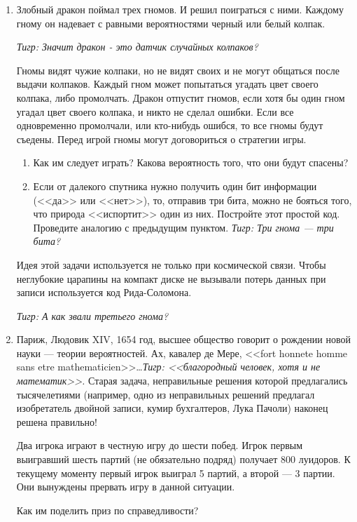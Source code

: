 \documentclass[12pt,a4paper]{article}
\begin{document}
\begin{enumerate}
\item Злобный дракон поймал трех гномов. И решил поиграться с ними. Каждому гному он надевает с равными вероятностями черный или белый колпак. \par
{\it Тигр: Значит дракон - это датчик случайных колпаков?} \par
Гномы видят чужие колпаки, но не видят своих и не могут общаться после выдачи колпаков. Каждый гном может попытаться угадать цвет своего колпака, либо промолчать. Дракон отпустит гномов, если хотя бы один гном угадал цвет своего колпака, и никто не сделал ошибки. Если все одновременно промолчали, или кто-нибудь ошибся, то все гномы будут съедены. Перед игрой гномы могут договориться о стратегии игры.
\begin{enumerate}
\item Как им следует играть? Какова вероятность того, что они будут спасены?
\item Если от далекого спутника нужно получить один бит информации (<<да>> или <<нет>>), то, отправив три бита, можно не бояться того, что природа <<испортит>> один из них. Постройте этот простой код. Проведите аналогию с предыдущим пунктом. {\it Тигр: Три гнома --- три бита?}
\end{enumerate}
Идея этой задачи используется не только при космической связи. Чтобы неглубокие царапины на компакт диске не вызывали потерь данных при записи используется код Рида-Соломона.\par
{\it Тигр: А как звали третьего гнома?}\par

\item Париж, Людовик XIV, 1654 год, высшее общество говорит о рождении новой науки --- теории вероятностей. Ах, кавалер де Мере, <<fort honnete homme sans etre mathematicien>>\ldots {\it Тигр:  <<благородный человек, хотя и не математик>>.} Старая задача, неправильные решения которой предлагались тысячелетиями (например, одно из неправильных решений предлагал изобретатель двойной записи, кумир бухгалтеров, Лука Пачоли) наконец решена правильно!\par
Два игрока играют в честную игру до шести побед. Игрок первым выигравший шесть партий (не обязательно подряд) получает 800 луидоров. К текущему моменту первый игрок выиграл 5 партий, а второй --- 3 партии. Они вынуждены прервать игру в данной ситуации.\par
Как им поделить приз по справедливости? 


\end{enumerate}
\end{document}
